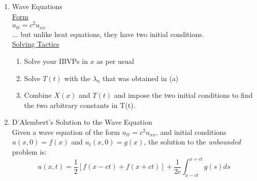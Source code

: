 \documentclass{article}
\begin{document}
\begin{enumerate}
\pagebreak
    \item Wave Equations
    \medskip\\
    \underline{Form}
    \medskip\\
    $u_{tt} = c^2u_{xx}$\\
    ... but unlike heat equations, they have two initial conditions.
    \medskip\\
    \underline{Solving Tactics}
    \begin{enumerate}
        \item Solve your IBVPs in $x$ as per usual
        \item Solve $T(t)$ with the $\lambda_n$ that was obtained in (a)
        \item Combine $X(x)$ and $T(t)$ and impose the two initial conditions to find the two arbitrary constants in T(t).
    \end{enumerate}
    
    \item D’Alembert's Solution to the Wave Equation
    \medskip\\
    Given a wave equation of the form $u_{tt} = c^2u_{xx}$, and initial conditions $u(x,0) = f(x)$ and $u_t(x,0) = g(x)$, the solution to the \textit{unbounded} problem is:
    \[
        u(x,t) = \frac{1}{2}\left[f(x-ct) + f(x+ct)\right] + \frac{1}{2c} \int_{x-ct}^{x+ct}g(s)ds
    \]
    

\end{enumerate}
\end{document}
